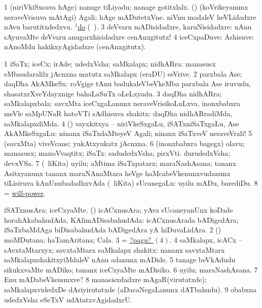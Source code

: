 \noindent
\gl{\pagu}
\expl{}
\bmng
\bnum
\num{1}  (niriVkiSxsuva hAge) nanage tiLiyadu; nanage gotitxlalx. 
  (\AmA) 
\banum
{} (koVrikeyanunx neraveVrisuva mAtAgi) Agali; hAge mADutetxVne.  niVnu modaleV heVLidadxre nAvu barutitxdedxvu. 
  \hyperref{kandict_d.pdf}{D}{do(1) nuga(34)}{$^1$do} (\pagu\ ). 
\eanum
\numie
\num{3}  deVvaru mADisidadxre, karuNisidadxre:  nAnu sAyuvaMte deVvaru anugarxhisidadxre cenAnxgitutx! 
\num{4}  iceCxpaDuve; Ashisuve:  nAnoMdu hakikxyAgidadxre (cenAnxgitutx). 
\enum
\emng
\eentry

\bentry
{} 
\gl{\nA}
\bmng
\bnum
\num{1} iSaTx; iceCx; irAde; udedxVsha; saMkalapx; nidhARra:  manasusx eMbaudaralilx jAcnxna matutx saMkalapx (eraDU) seVrive. 
\num{2} parxbala Ase; daqDha AkAMkeSx:  roVgige tAnu badukaleVbeVkeMba parxbala Ase iruvudu, shasatxrXveYdayxnige bahaLaSuTx oLeLxyadu. 
\num{3} daqDha nidhARra; saMkalapxbala; savxMta iceCxgaLanunx neraveVrisikoLuLxva, inonxbabxra meVle saMpUNaR hatoVTi sAdhisuva shakitx:  daqDha nidhARradiMda, saMkalapxdiMda. 
\num{4} (\pArxparx) vayxkitxya -- niriVkeSxgaLu, iSATxniSaTxgaLu, Ase AkAMkeSxgaLu:  ninanx iSaTxdaMteyeV Agali; ninanx iSaTxveV neraveVrali! 
\num{5} (savxMta) viveVcane; yukAtxyukatx jAcnxna. 
\num{6} (inonxbabxra bagegx) olavu; manasusx; manoVvaqtitx; iSaTx:  sadudedxVsha; pirxVti.  durudedxVsha; devxVSa. 
\num{7} (\sA\ liKita) uyilu; aMtima iSaTxpatarx; maraNashAsana; tananx Asitxyanunx tananx maraNAnaMtara heVge haMcabeVkenunxvudanunx tiLisiruva kAnUnubadadhxvAda (\sA\ liKita) sUcanegaLu:  uyilu mADu, barediDu. 
\num{8} = \hyperlink{will-power}{will-power}. 
\enum
\emng

\noindent
\gl{\pagu}
\bmng
\bnum
{}  
\banum
{} iSATxnusAra; iceCxyaMte. 
 (\nAyxshA) icACxnusAra; yAva sUcaneyanUnx koDade horahAkabahudAda, KAlimADisabahudAda:  icACxnusArada bADigedAra; iSaTxbaMdAga biDisabahudAda bADigedAra yA hiDuvaLidAra. 
\eanum
\numie
\num{2}  (\sw) moMDutana; haTamAritana; Cala. 
\num{3}  = \hyperlink{will pagu4}{?pagu? \((4)\)}. 
\hypertarget{will pagu4}{} 
\num{4}  saMkalapx, icACx -- sAvxtaMtarxyx; savxtaMtarx saMkalapx shakitx:  nananx savxtaMtarx saMkalapxshakitxyiMdaleV nAnu adanunx mADide. 
\num{5}  tanage beVkAdudu sikukxvaMte mADiko; tananx iceCxyaMte mADisiko. 
\num{6}  uyilu; maraNashAsana. 
\num{7}  Enu mADabeVkenunxve? 
\num{8}  manasisxdadxre mAgaR(virutatxde); saMkalapxvidedxDe dAriyirutatxde (aDacaNegaLanunx dATbahudu). 
\num{9}  obabxna udedxVsha eSeTxV udAtatxvAgidadxrU. 
\enum
\emng
\eentry

